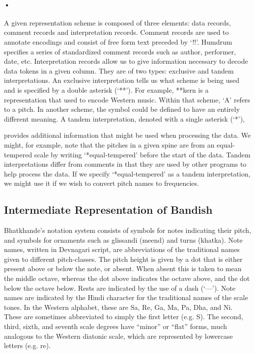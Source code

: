 \documentclass[12pt,a4paper]{article}
\begin{document}
\paragraph{•}
A given representation scheme is composed of three elements: data records, comment records and interpretation records. Comment records are used to annotate encodings and consist of free form text preceded by ‘!!’. Humdrum specifies a series of standardized comment records such as author, performer, date, etc. Interpretation records allow us to give information necessary to decode data tokens in a given column. They are of two types: exclusive and tandem interpretations. An exclusive interpretation tells us what scheme is being used and is specified by a double asterisk (‘**’). For example, **kern is a representation that used to encode Western music. Within that scheme, `A' refers to a pitch. In another scheme, the symbol could be defined to have an entirely different meaning. A tandem interpretation, denoted with a single asterisk (‘*’),

provides additional information that might be used when processing the data. We might, for example, note that the pitches in a given spine are from an equal-tempered scale by writing ‘*equal-tempered’ before the start of the data. Tandem interpretations differ from comments in that they are used by other programs to help process the data. If we specify ‘*equal-tempered’ as a tandem interpretation, we might use it if we wish to convert pitch names to frequencies.

\subsection{Intermediate Representation of Bandish}

Bhatkhande’s notation system consists of symbols for notes indicating their pitch, and symbols for ornaments such as glissandi (meend) and turns (khatka). Note names, written in Devnagari script, are abbreviations of the traditional names given to different pitch-classes. The pitch height is given by a dot that is either present above or below the note, or absent. When absent this is taken to mean the middle octave, whereas the dot above indicates the octave above, and the dot below the octave below. Rests are indicated by the use of a dash (‘—’).
Note names are indicated by the Hindi character for the traditional names of the scale tones. In the Western alphabet, these are Sa, Re, Ga, Ma, Pa, Dha, and Ni. These are sometimes abbreviated to simply the first letter (e.g. S). The second, third, sixth, and seventh scale degrees have “minor” or “flat” forms, much analogous to the Western diatonic scale, which are represented by lowercase letters (e.g. re).
\end{document}

